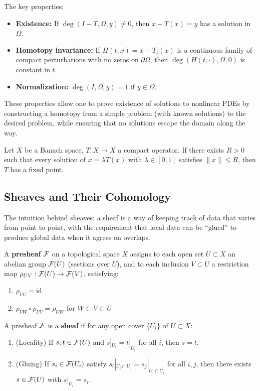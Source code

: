 The key properties:
\begin{itemize}
\item \textbf{Existence:} If $\deg(I - T, \Omega, y) \neq 0$, then $x - T(x) = y$ has a solution in $\Omega$.
\item \textbf{Homotopy invariance:} If $H(t,x) = x - T_t(x)$ is a continuous family of compact perturbations with no zeros on $\partial\Omega$, then $\deg(H(t,\cdot),\Omega,0)$ is constant in $t$.
\item \textbf{Normalization:} $\deg(I, \Omega, y) = 1$ if $y \in \Omega$.
\end{itemize}

These properties allow one to prove existence of solutions to nonlinear PDEs by constructing a homotopy from a simple problem (with known solutions) to the desired problem, while ensuring that no solutions escape the domain along the way.

\begin{theorem}
Let $X$ be a Banach space, $T: X \to X$ a compact operator. If there exists $R > 0$ such that every solution of $x = \lambda T(x)$ with $\lambda \in [0,1]$ satisfies $\|x\| \leq R$, then $T$ has a fixed point.
\end{theorem}

\subsection{Sheaves and Their Cohomology}

The intuition behind sheaves: a sheaf is a way of keeping track of data that varies from point to point, with the requirement that local data can be ``glued'' to produce global data when it agrees on overlaps.

\begin{definition}[Presheaf]
A \textbf{presheaf} $\mathcal{F}$ on a topological space $X$ assigns to each open set $U \subset X$ an abelian group $\mathcal{F}(U)$ (sections over $U$), and to each inclusion $V \subset U$ a restriction map $\rho_{UV}: \mathcal{F}(U) \to \mathcal{F}(V)$, satisfying:
\begin{enumerate}
\item $\rho_{UU} = \text{id}$
\item $\rho_{VW} \circ \rho_{UV} = \rho_{UW}$ for $W \subset V \subset U$
\end{enumerate}
\end{definition}

\begin{definition}[Sheaf]
A presheaf $\mathcal{F}$ is a \textbf{sheaf} if for any open cover $\{U_i\}$ of $U \subset X$:
\begin{enumerate}
\item (Locality) If $s,t \in \mathcal{F}(U)$ and $s|_{U_i} = t|_{U_i}$ for all $i$, then $s = t$.
\item (Gluing) If $s_i \in \mathcal{F}(U_i)$ satisfy $s_i|_{U_i \cap U_j} = s_j|_{U_i \cap U_j}$ for all $i,j$, then there exists $s \in \mathcal{F}(U)$ with $s|_{U_i} = s_i$.
\end{enumerate}
\end{definition}

